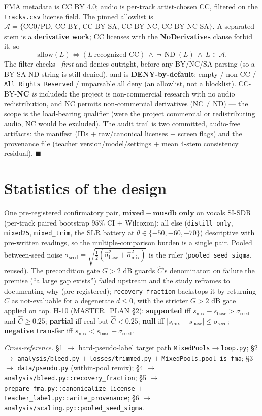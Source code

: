 \documentclass[11pt]{article}
\newcommand{\code}[1]{\texttt{#1}}
\DeclareMathOperator{\ND}{ND}
\newcommand{\sbase}{s_{\text{base}}}
\newcommand{\smix}{s_{\text{mix}}}
\newcommand{\Chat}{\hat C}
\begin{document}
FMA metadata is CC BY 4.0; audio is per-track artist-chosen CC, filtered on the \code{tracks.csv}
license field. The pinned allowlist is $\mathcal A=\{\text{CC0/PD, CC-BY, CC-BY-SA, CC-BY-NC,
CC-BY-NC-SA}\}$. A separated stem is a \textbf{derivative work}; CC licenses with the
\textbf{NoDerivatives} clause forbid it, so
\[
\boxed{\ \text{allow}(L)\iff (L\ \text{recognized CC})\ \wedge\ \neg\,\ND(L)\ \wedge\ L\in\mathcal A.\ }
\]
The filter checks \ND\ \emph{first} and denies outright, before any BY/NC/SA parsing (so a BY-SA-ND
string is still denied), and is \textbf{DENY-by-default}: empty / non-CC / \texttt{All Rights
Reserved} / unparsable all deny (an allowlist, not a blocklist). CC-BY-\textbf{NC} \emph{is}
included: the project is non-commercial research with no audio redistribution, and NC permits
non-commercial derivatives (NC$\neq$ND) --- the scope is the load-bearing qualifier (were the
project commercial or redistributing audio, NC would be excluded). The audit trail is two committed,
audio-free artifacts: the manifest (IDs $+$ raw/canonical licenses $+$ screen flags) and the
provenance file (teacher version/model/settings $+$ mean 4-stem consistency residual).\hfill
$\blacksquare$

\section{Statistics of the design}

One pre-registered confirmatory pair, $\mathbf{mixed}-\mathbf{musdb\_only}$ on vocals SI-SDR
(per-track paired bootstrap $95\%$ CI $+$ Wilcoxon); all else (\code{distill\_only},
\code{mixed25}, \code{mixed\_trim}, the SLR battery at $\theta\in\{-50,-60,-70\}$) descriptive with
pre-written readings, so the multiple-comparison burden is a single pair. Pooled between-seed noise
$\sigma_{\text{seed}}=\sqrt{\tfrac12(\hat\sigma_{\text{base}}^2+\hat\sigma_{\text{mix}}^2)}$ is the
ruler (\code{pooled\_seed\_sigma}, reused). The precondition gate $G>2$ dB guards $\Chat$'s
denominator: on failure the premise (``a large gap exists'') failed upstream and the study reframes
to documenting why (pre-registered); \code{recovery\_fraction} backstops it by returning $\Chat$ as
not-evaluable for a degenerate $d\le0$, with the stricter $G>2$ dB gate applied on top. H-10 (MASTER\_PLAN \S2): \textbf{supported} iff
$\smix-\sbase>\sigma_{\text{seed}}$ and $\Chat\ge0.25$; \textbf{partial} iff real but
$\Chat<0.25$; \textbf{null} iff $|\smix-\sbase|\le\sigma_{\text{seed}}$; \textbf{negative transfer}
iff $\smix<\sbase-\sigma_{\text{seed}}$.

\bigskip
\noindent\emph{Cross-reference.} \S1 $\to$ hard-pseudo-label target path
\code{MixedPools}$\to$\code{loop.py}; \S2 $\to$ \code{analysis/bleed.py} $+$ \code{losses/trimmed.py}
$+$ \code{MixedPools.pool\_is\_fma}; \S3 $\to$ \code{data/pseudo.py} (within-pool remix); \S4 $\to$
\code{analysis/bleed.py::recovery\_fraction}; \S5 $\to$ \code{prepare\_fma.py::canonicalize\_license}
$+$ \code{teacher\_label.py::write\_provenance}; \S6 $\to$ \code{analysis/scaling.py::pooled\_seed\_sigma}.
\end{document}
